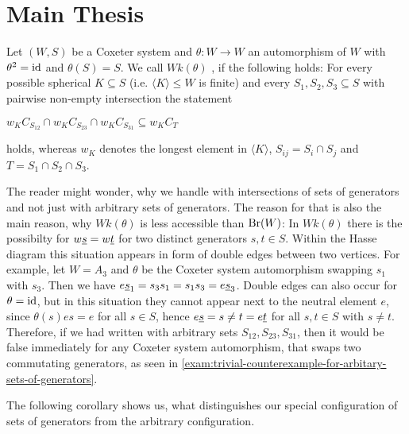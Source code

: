 \chapter{Main Thesis}
\label{sec:main-thesis}

\begin{defi}
	Let $(W,S)$ be a Coxeter system and $\theta : W \to W$ an automorphism of $W$ with $\theta^2 = \operatorname{id}$ and $\theta(S) = S$. We call $Wk(\theta)$ , if the following holds: For every possible spherical $K \subseteq S$ (i.e. $\langle K \rangle \leq W$ is finite) and every $S_1,S_2,S_3 \subseteq S$ with pairwise non-empty intersection the statement
	\begin{axioms}
		 $w_K C_{S_{12}} \cap w_K C_{S_{23}} \cap w_K C_{S_{31}} \subseteq w_K C_T$
	\end{axioms}
	holds, whereas $w_K$ denotes the longest element in $\langle K \rangle$, $S_{ij} = S_i \cap S_j$ and $T = S_1 \cap S_2 \cap S_3$.
\end{defi}

The reader might wonder, why we handle with intersections of sets of generators and not just with arbitrary sets of generators. The reason for that is also the main reason, why $Wk(\theta)$ is less accessible than $\operatorname{Br}(W)$: In $Wk(\theta)$ there is the possibilty for $w \underline{s} = w \underline{t}$ for two distinct generators $s,t \in S$. Within the Hasse diagram this situation appears in form of double edges between two vertices. For example, let $W = A_3$ and $\theta$ be the Coxeter system automorphism swapping $s_1$ with $s_3$. Then we have $e \underline{s}_1 = s_3 s_1 = s_1 s_3 = e \underline{s}_3$. Double edges can also occur for $\theta = \operatorname{id}$, but in this situation they cannot appear next to the neutral element $e$, since $\theta(s)es = e$ for all $s \in S$, hence $e \underline{s} = s \neq t = e \underline{t}$ for all $s,t \in S$ with $s \neq t$. Therefore, if we had written  with arbitrary sets $S_{12},S_{23},S_{31}$, then it would be false immediately for any Coxeter system automorphism, that swaps two commutating generators, as seen in \ref{exam:trivial-counterexample-for-arbitary-sets-of-generators}.

The following corollary shows us, what distinguishes our special configuration of sets of generators from the arbitrary configuration.

